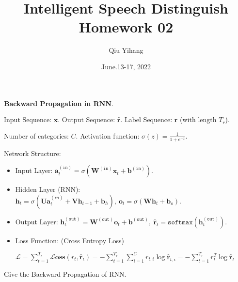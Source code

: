 \documentclass{article}
\title{\textbf{Intelligent Speech Distinguish Homework 02}}
\author{Qiu Yihang}
\date{June.13-17, 2022}
\renewcommand{\bf}[1]{\mathbf{#1}}
\renewcommand{\tt}[1]{\mathtt{#1}}
\begin{document}
\maketitle

\hspace{-1.8em}
\textbf{Backward Propagation in RNN}.

\hspace{-1.8em}
Input Sequence: $\bf{x}$. Output Sequence: $\hat{\bf{r}}$. Label Sequence: $\bf{r}$ (with length $T_r$).

\hspace{-1.8em}
Number of categories: $C$.
Activation function: $\sigma(z)=\frac{1}{1+e^{-z}}$.

\vspace{1em} \hspace{-1.8em}
Network Structure:

\begin{itemize}
    \item Input Layer: $\bf{a}_t^{\tt{(in)}}=\sigma\left(\bf{W}^{\tt{(in)}}\bf{x}_t+\bf{b}^{\tt{(in)}}\right).$
    \item Hidden Layer (RNN):
    $\bf{h}_t=\sigma\left(\bf{U}\bf{a}_t^{(in)}+\bf{V}\bf{h}_{t-1}+\bf{b}_h\right),\ \bf{o}_t=\sigma\left(\bf{W}\bf{h}_t+\bf{b}_o\right).$
    
    \item Output Layer:
    $\bf{h}_t^{\tt{(out)}}=\bf{W}^{\tt{(out)}}\bf{o}_t+\bf{b}^{\tt{(out)}},\ \hat{\bf{r}}_t=\mathtt{softmax}\left(\bf{h}_t^{\tt{(out)}}\right).$
    
    \item Loss Function: (Cross Entropy Loss)
    
    $\mathcal{L}=\sum_{t=1}^{T_r}\mathcal{L}\bf{oss}(r_t,\hat{\bf{r}}_t)=-\sum_{t=1}^{T_r}\sum_{i=1}^Cr_{t,i}\log\hat{\bf{r}}_{t,i}=-\sum_{t=1}^{T_r}r_t^T\log\hat{\bf{r}}_t$
    
\end{itemize}

\hspace{-1.8em}
Give the Backward Propagation of RNN.
\end{document}
